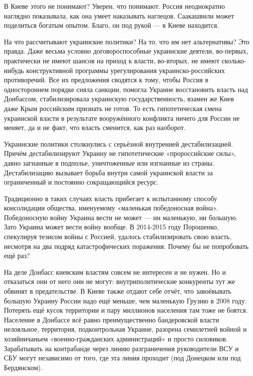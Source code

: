 В Киеве этого не понимают? Уверен, что понимают. Россия неоднократно наглядно
показывала, как она умеет наказывать наглецов. Саакашвили может поделиться
богатым опытом. Благо, он под рукой — в Киеве находится.


На что рассчитывают украинские политики? На то, что им нет альтернативы? Это
правда. Даже весьма условно договороспособные украинские деятели, во-первых,
практически не имеют шансов на приход к власти, во-вторых, не имеют
сколько-нибудь конструктивной программы урегулирования украинско-российских
противоречий. Все их предложения сводятся к тому, чтобы Россия в одностороннем
порядке сняла санкции, помогла Украине восстановить власть над Донбассом,
стабилизировала украинскую государственность, взамен же Киев даже Крым
российским признать не готов. То есть гипотетическая смена украинской власти в
результате вооружённого конфликта ничего для России не меняет, да и не факт,
что власть сменится, как раз наоборот.

Украинские политики столкнулись с серьёзной внутренней дестабилизацией. Причём
дестабилизируют Украину не гипотетические «пророссийские силы», давно загнанные
в подполье, уничтоженные или изгнанные из страны. Дестабилизацию вызывает
борьба внутри самой украинской власти за ограниченный и постоянно сокращающийся
ресурс.

Традиционно в таких случаях власть прибегает к испытанному способу консолидации
общества, именуемому «маленькая победоносная война». Победоносную войну Украина
вести не может — ни маленькую, ни большую. Зато Украина может вести войну
вообще. В 2014-2015 году Порошенко, спекулируя тезисом войны с Россией, удалось
стабилизировать свою власть, несмотря на два подряд катастрофических поражения.
Почему бы не попробовать ещё раз?

На деле Донбасс киевским властям совсем не интересен и не нужен. Но и
отказаться они от него они не могут: внутриполитические конкуренты тут же
обвинят в предательстве. В Киеве также отдают себе отчёт, что завоёвывать
большую Украину России надо ещё меньше, чем маленькую Грузию в 2008 году.
Потерять ещё кусок территории и пару миллионов населения там тоже не боятся.
Население в Донбассе всё равно преимущественно бандеровской власти нелояльное,
территория, подконтрольная Украине,  разорена семилетней войной и хозяйничаньем
«военно-гражданских администраций» и просто силовиков. Зарабатывать на
контрабанде через линию разграничения руководители ВСУ и СБУ могут независимо
от того, где эта линия проходит (под Донецком или под Бердянском).

